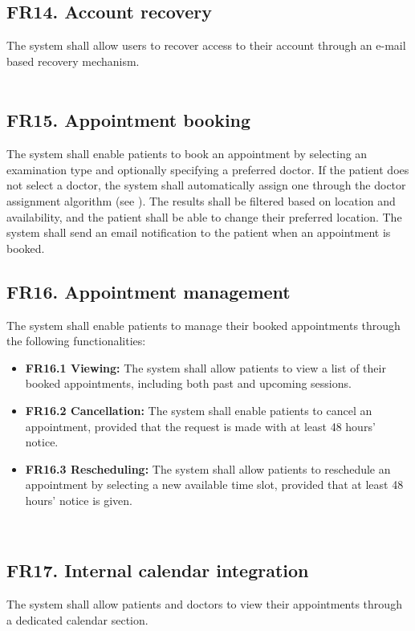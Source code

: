 \documentclass[12pt, a4paper]{article}
\begin{document}
\subsection{FR14. Account recovery}\label{FR14}
The system shall allow users to recover access to their account through an e-mail based recovery mechanism.
\\  
\\ 

\subsection{FR15. Appointment booking} \label{FR15}
The system shall enable patients to book an appointment by selecting an examination type and optionally specifying a preferred doctor. If the patient does not select a doctor, the system shall automatically assign one through the doctor assignment algorithm (see ). The results shall be filtered based on location and availability, and the patient shall be able to change their preferred location. The system shall send an email notification to the patient when an appointment is booked.
\\ 


\subsection{FR16. Appointment management} \label{FR16}
The system shall enable patients to manage their booked appointments through the following functionalities:

\begin{itemize}
    \item \textbf{FR16.1 Viewing:} The system shall allow patients to view a list of their booked appointments, including both past and upcoming sessions.
    \item \textbf{FR16.2 Cancellation:} The system shall enable patients to cancel an appointment, provided that the request is made with at least 48 hours' notice.
    \item \textbf{FR16.3 Rescheduling:} The system shall allow patients to reschedule an appointment by selecting a new available time slot, provided that at least 48 hours' notice is given.
\end{itemize}
 \\


\subsection{FR17. Internal calendar integration} \label{FR17}
The system shall allow patients and doctors to view their appointments through a dedicated calendar section.
\\ 
\\ 
\\ 
\end{document}
